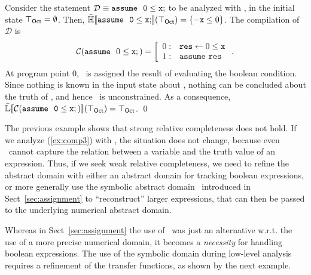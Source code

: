 \documentclass{llncs}
\begin{document}
\begin{example}
Consider the statement $\mathcal{D} \equiv \mathtt{assume}~\ 0 \leq \mathtt{x};$
to be analyzed with \Octagons, in the initial state ${\top}_{\mathsf{Oct}} =
\emptyset$.  Then, $\mathbb{\bar{H}}\llbracket \mathtt{ \mathtt{assume}~\ 0 \leq \mathtt{x};} \rrbracket({\top}_{\mathsf{Oct}})
= \{ -\mathtt{x} \leq 0 \}$.  The compilation of $\mathcal{D}$ is
\begin{equation}
  \mathcal{C}( \mathtt{assume}~\ 0 \leq \mathtt{x};) = \left [
    \begin{array}{r l}
      0: & \mathtt{res} \leftarrow 0 \leq \mathtt{x} \\
      1: & \mathtt{assume}~ \mathtt{res}
    \end{array} \right. .
  \label{ex:comp3}
\end{equation}
At program point $0$, \result\ is assigned the result of
evaluating the boolean condition. Since nothing is known in the
input state about , nothing can be concluded about the
truth of , and hence \result \ is unconstrained.
As a consequence, $\mathbb{\bar{L}}\llbracket \mathtt{\mathcal{C}(\mathtt{assume}~\ 0 \leq
\mathtt{x};)} \rrbracket({\top}_{\mathsf{Oct}}) = {\top}_{\mathsf{Oct}}$. \qed
\end{example}
The previous example shows that strong relative completeness does not
hold.  If we analyze (\ref{ex:comp3}) with \Polyhedra, the situation
does not change, because even \Polyhedra\ cannot capture the relation
between a variable and the truth value of an expression.  Thus, if we
seek weak relative completeness, we need to refine the abstract
domain with either an abstract domain for tracking boolean
expressions, or more generally use the symbolic abstract domain
\Symbolic\ introduced in Sect~\ref{sec:assignment} to
``reconstruct'' larger expressions, that can then be passed to
the underlying numerical abstract domain.

Whereas in Sect~\ref{sec:assignment} the use of \Symbolic\ was just an
alternative w.r.t. the use of a more precise numerical domain, it
becomes a \emph{necessity} for handling boolean expressions.  
The use of the symbolic domain during low-level analysis requires a refinement of the
transfer functions, as shown by the next example.
\end{document}
